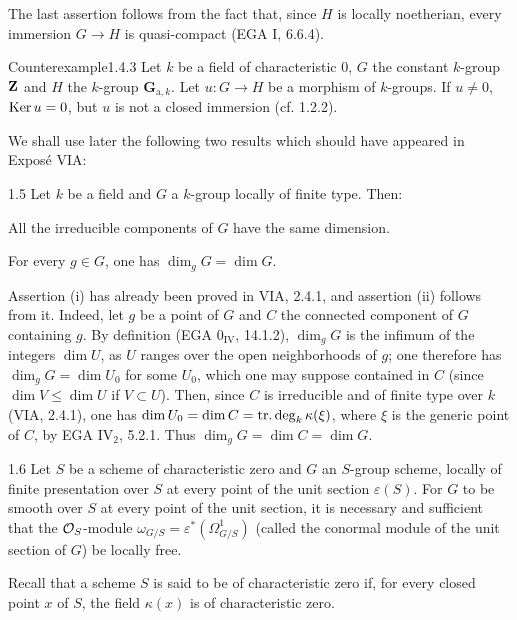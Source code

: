 The last assertion follows from the fact that, since $H$ is locally noetherian, every immersion $G\to H$ is quasi-compact (EGA I, 6.6.4).
\begin{enoncerm}{Counterexample}{1.4.3}\label{VIB.1.4.3}
Let $k$ be a field of characteristic $0$, $G$ the constant $k$-group $\mathbf{Z}$ and $H$ the $k$-group $\mathbf G_{\mathrm a,k}$. Let $u:G\to H$ be a morphism of $k$-groups. If $u\ne0$, $\operatorname{Ker} u=0$, but $u$ is not a closed immersion (cf. 1.2.2).
\end{enoncerm}
We shall use later the following two results which should have appeared in Exposé VIA:
\begin{lemma}{1.5}\label{VIB.1.5}
Let $k$ be a field and $G$ a $k$-group locally of finite type. Then:
\begin{enumeratei}
\item All the irreducible components of $G$ have the same dimension.
\item For every $g\in G$, one has $\dim_gG=\dim G$.
\end{enumeratei}
\end{lemma}
Assertion (i) has already been proved in VIA, 2.4.1, and assertion (ii) follows from it. Indeed, let $g$ be a point of $G$ and $C$ the connected component of $G$ containing $g$. By definition (EGA 0$_{\mathrm{IV}}$, 14.1.2), $\dim_gG$ is the infimum of the integers $\dim U$, as $U$ ranges over the open neighborhoods of $g$; one therefore has $\dim_gG=\dim U_0$ for some $U_0$, which one may suppose contained in $C$ (since $\dim V\le\dim U$ if $V\subset U$). Then, since $C$ is irreducible and of finite type over $k$ (VIA, 2.4.1), one has $\dim U_0=\dim C=\operatorname{tr.deg}_k\kappa(\xi)$, where $\xi$ is the generic point of $C$, by EGA IV$_2$, 5.2.1. Thus $\dim_gG=\dim C=\dim G$.
\begin{proposition}{1.6}\label{VIB.1.6}
Let $S$ be a scheme of characteristic zero and $G$ an $S$-group scheme, locally of finite presentation over $S$ at every point of the unit section $\varepsilon(S)$. For $G$ to be smooth over $S$ at every point of the unit section, it is necessary and sufficient that the $\mathcal{O}_S$-module $\omega_{G/S}=\varepsilon^*(\Omega^1_{G/S})$ (called the conormal module of the unit section of $G$) be locally free.
\end{proposition}
Recall that a scheme $S$ is said to be of characteristic zero if, for every closed point $x$ of $S$, the field $\kappa(x)$ is of characteristic zero.

